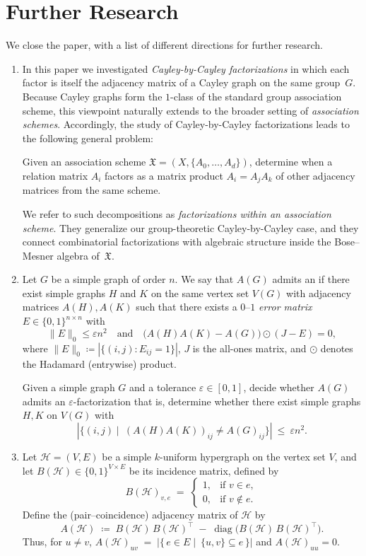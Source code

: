 \documentclass{file}
\begin{document}
\section{Further Research}
We close the paper, with a list of different directions for further research.
\begin{enumerate}
\item In this paper we investigated \emph{Cayley-by-Cayley factorizations}
in which each factor is itself the adjacency matrix of a Cayley graph on the same group~$G$.
Because Cayley graphs form the $1$-class of the standard group association scheme, this viewpoint naturally extends to the broader setting of \emph{association schemes}.
Accordingly, the study of Cayley-by-Cayley factorizations leads to the following general problem:
\begin{op}
Given an association scheme $\mathfrak X=(X,\{A_0,\dots,A_d\})$, determine when a relation matrix
$A_i$ factors as a matrix product $A_i=A_jA_k$ of other adjacency matrices from the same scheme.
\end{op}
We refer to such decompositions as \emph{factorizations within an association scheme}.
They generalize our group-theoretic Cayley-by-Cayley case, and they connect combinatorial
factorizations with algebraic structure inside the Bose–Mesner algebra of~$\mathfrak X$.
\item Let $G$ be a simple graph of order $n$.
We say that $A(G)$ admits an  if there exist simple graphs $H$ and $K$ on the same vertex set $V(G)$ with adjacency matrices $A(H),A(K)$ such that there exists a $0$--$1$ \emph{error matrix} $E\in\{0,1\}^{n\times n}$ with
\[
\|E\|_0\le \varepsilon n^2
\quad\text{and}\quad
\bigl(A(H)A(K)-A(G)\bigr)\odot (J-E)=0,
\]
where $\|E\|_0\coloneqq |\{(i,j):E_{ij}=1\}|$, $J$ is the all-ones matrix, and $\odot$ denotes the Hadamard (entrywise) product.

\begin{op}\label{prob:approx-factorization}
Given a simple graph $G$ and a tolerance $\varepsilon\in[0,1]$, decide whether $A(G)$ admits an $\varepsilon$-factorization that is, determine whether there exist simple graphs $H,K$ on $V(G)$ with
\[
|\{(i,j)\mid \ (A(H)A(K))_{ij}\neq A(G)_{ij}\}|\ \le\ \varepsilon n^2.
\]
\end{op}
\item Let $\mathcal H=(V,E)$ be a simple $k$-uniform hypergraph on the vertex set $V$, and let
$B(\mathcal H)\in\{0,1\}^{V\times E}$ be its incidence matrix, defined by
\[
B(\mathcal H)_{v,e} \;=\;
\begin{cases}
1,& \text{if } v\in e,\\
0,& \text{if } v\notin e.
\end{cases}
\]
Define the (pair–coincidence) adjacency matrix of $\mathcal H$ by
\[
A(\mathcal H)\;\coloneqq \;B(\mathcal H)\,B(\mathcal H)^{\!\top}\;-\;\operatorname{diag}\!\bigl(B(\mathcal H)\,B(\mathcal H)^{\!\top}\bigr).
\]
Thus, for $u\neq v$,
$A(\mathcal H)_{uv}\;=\;\bigl|\{\,e\in E\mid\ \{u,v\}\subseteq e\,\}\bigr|$ and $A(\mathcal H)_{uu}=0$.


\end{enumerate}
\end{document}
